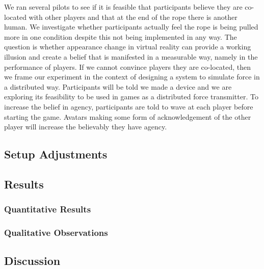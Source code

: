 We ran several pilots to see if it is feasible that participants believe they are co-located with other players and that at the end of the rope there is another human. We investigate whether participants actually feel the rope is being pulled more in one condition despite this not being implemented in any way. The question is whether appearance change in virtual reality can provide a working illusion and create a belief that is manifested in a measurable way, namely in the performance of players.
If we cannot convince players they are co-located, then we frame our experiment in the context of designing a system to simulate force in a distributed way. Participants will be told we made a device and we are exploring its feasibility to be used in games as a distributed force transmitter. 
To increase the belief in agency, participants are told to wave at each player before starting the game. Avatars making some form of acknowledgement of the other player will increase the believably they have agency. 


\subsection{Setup Adjustments}

\subsection{Results}
\subsubsection{Quantitative Results}
\subsubsection{Qualitative Observations}


\subsection{Discussion}
